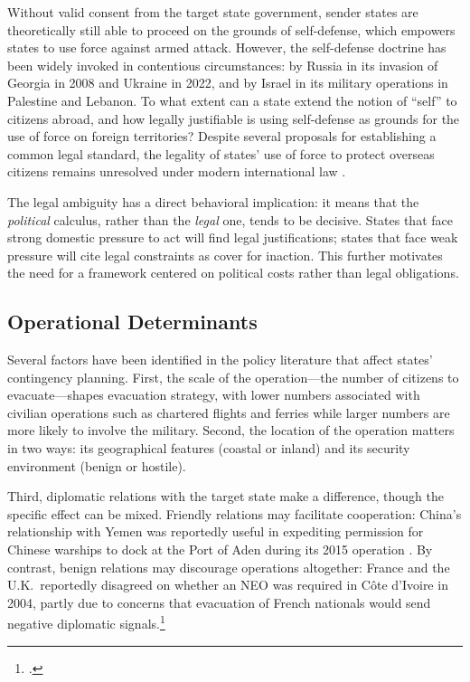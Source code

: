 \documentclass[12pt]{article}
\begin{document}
Without valid consent from the target state government, sender states are theoretically still able to proceed on the grounds of self-defense, which empowers states to use force against armed attack. However, the self-defense doctrine has been widely invoked in contentious circumstances: by Russia in its invasion of Georgia in 2008 and Ukraine in 2022, and by Israel in its military operations in Palestine and Lebanon. To what extent can a state extend the notion of ``self'' to citizens abroad, and how legally justifiable is using self-defense as grounds for the use of force on foreign territories? Despite several proposals for establishing a common legal standard, the legality of states' use of force to protect overseas citizens remains unresolved under modern international law \citep{Alcala2024}.

The legal ambiguity has a direct behavioral implication: it means that the \emph{political} calculus, rather than the \emph{legal} one, tends to be decisive. States that face strong domestic pressure to act will find legal justifications; states that face weak pressure will cite legal constraints as cover for inaction. This further motivates the need for a framework centered on political costs rather than legal obligations.

\subsection{Operational Determinants}

Several factors have been identified in the policy literature that affect states' contingency planning. First, the scale of the operation---the number of citizens to evacuate---shapes evacuation strategy, with lower numbers associated with civilian operations such as chartered flights and ferries while larger numbers are more likely to involve the military. Second, the location of the operation matters in two ways: its geographical features (coastal or inland) and its security environment (benign or hostile).

Third, diplomatic relations with the target state make a difference, though the specific effect can be mixed. Friendly relations may facilitate cooperation: China's relationship with Yemen was reportedly useful in expediting permission for Chinese warships to dock at the Port of Aden during its 2015 operation \citep{Zhao2015}. By contrast, benign relations may discourage operations altogether: France and the U.K.\ reportedly disagreed on whether an NEO was required in C\^{o}te d'Ivoire in 2004, partly due to concerns that evacuation of French nationals would send negative diplomatic signals.\footnote{\citet{Schwarck2016}.}
\end{document}
